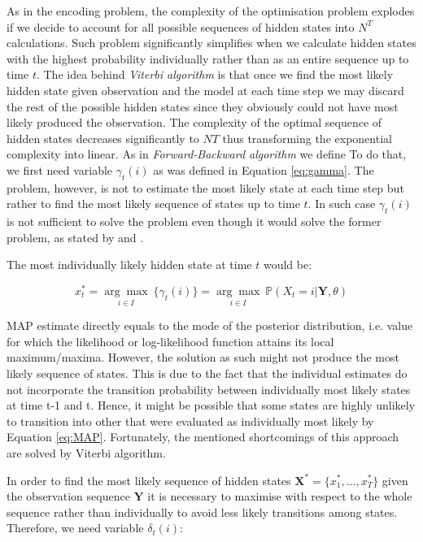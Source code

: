 As in the encoding problem, the complexity of the optimisation problem explodes if we decide to account for all possible sequences of hidden states into $N^T$ calculations. 
Such problem significantly simplifies when we calculate hidden states with the highest probability individually rather than as an entire sequence up to time $t$. 
The idea behind \textit{Viterbi algorithm} is that once we find the most likely hidden state given observation and the model at each time step 
we may discard the rest of the possible hidden states since they obviously could not have most likely produced the observation. The complexity of the optimal 
sequence of hidden states decreases significantly to $NT$ thus transforming the exponential complexity into linear. As in \textit{Forward-Backward algorithm} we define 
To do that, we first need variable $\gamma_t(i)$ as was defined in Equation \ref{eq:gamma}. The problem, however, is not to estimate the most likely state at each time step
but rather to find the most likely sequence of states up to time $t$. In such case $\gamma_t(i)$ is not sufficient to solve the problem even though it would solve the former problem, as stated by \citep{Rabiner1989} and \citep{Oliver2013}.

The most individually likely hidden state at time $t$ would be:

\begin{equation}
    x_t^* = \underset{i \in I}{\arg\max}\: \{\gamma_t(i)\} = \underset{i \in I}{\arg\max}\: \mathbb{P}(X_t=i|\textbf{Y},\theta)
\end{equation}

MAP estimate directly equals to the mode of the posterior distribution, i.e. value for which the likelihood or log-likelihood function attains its local maximum/maxima. 
However, the solution as such might not produce the most likely sequence of states. This is due to the fact that the individual estimates do not incorporate 
the transition probability between individually most likely states at time t-1 and t. Hence, it might be possible that some states are highly unlikely to transition 
into other that were evaluated as individually most likely by Equation \ref{eq:MAP}. Fortunately, the mentioned shortcomings of this approach are solved by Viterbi algorithm.

In order to find the most likely sequence of hidden states $\textbf{X}^*=\{x_1^*,\ldots,x_T^*\}$ given the observation sequence $\textbf{Y}$ it is necessary 
to maximise with respect to the whole sequence rather than individually to avoid less likely transitions among states.
Therefore, we need variable $\delta_t(i)$:


